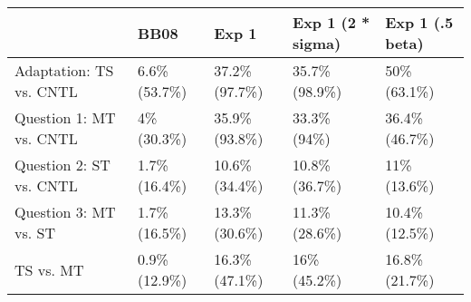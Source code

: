 
\begin{tabular}{l|l|l|l|l}
\hline
  & BB08 & Exp 1 & Exp 1 (2 * sigma) & Exp 1 (.5 beta)\\
\hline
Adaptation: TS vs. CNTL & 6.6\% (53.7\%) & 37.2\% (97.7\%) & 35.7\% (98.9\%) & 50\% (63.1\%)\\
\hline
Question 1: MT vs. CNTL & 4\% (30.3\%) & 35.9\% (93.8\%) & 33.3\% (94\%) & 36.4\% (46.7\%)\\
\hline
Question 2: ST vs. CNTL & 1.7\% (16.4\%) & 10.6\% (34.4\%) & 10.8\% (36.7\%) & 11\% (13.6\%)\\
\hline
Question 3: MT vs. ST & 1.7\% (16.5\%) & 13.3\% (30.6\%) & 11.3\% (28.6\%) & 10.4\% (12.5\%)\\
\hline
TS vs. MT & 0.9\% (12.9\%) & 16.3\% (47.1\%) & 16\% (45.2\%) & 16.8\% (21.7\%)\\
\hline
\end{tabular}
